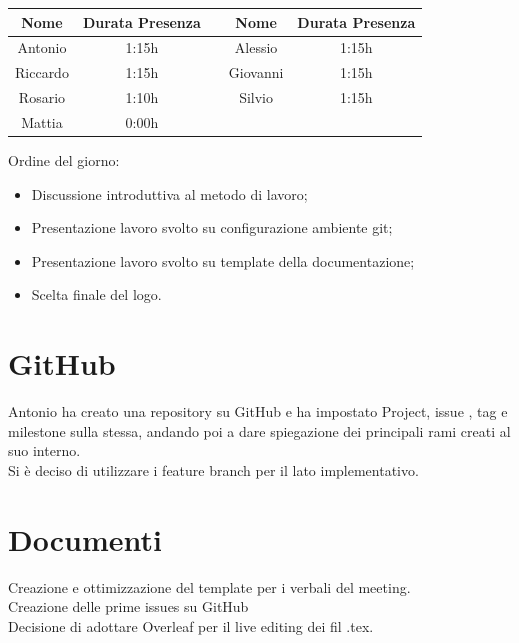 \documentclass[12pt,a4paper]{article}
\begin{document}
\begin{center}
    \begin{tabular}{ |c|c|c|c|c| }
        \hline
        Nome     & Durata Presenza &  & Nome     & Durata Presenza \\
        \hline
        Antonio  & 1:15h           &  & Alessio  & 1:15h           \\
        \hline
        Riccardo & 1:15h           &  & Giovanni & 1:15h           \\
        \hline
        Rosario  & 1:10h           &  & Silvio   & 1:15h           \\
        \hline
        Mattia   & 0:00h           &  &          &                 \\
        \hline

    \end{tabular}
\end{center}

\newpage
Ordine del giorno:

\begin{itemize}
    \item Discussione introduttiva al metodo di lavoro;    
    \item Presentazione lavoro svolto su configurazione ambiente git;
    \item Presentazione lavoro svolto su template della documentazione;
    \item Scelta finale del logo.

\end{itemize}

\section{GitHub}
Antonio ha creato una repository su GitHub e ha impostato Project, issue , tag e milestone sulla stessa, andando poi a dare spiegazione dei principali rami creati al suo interno. \\
Si è deciso di utilizzare i feature branch per il lato implementativo.\\

\section{Documenti}
Creazione e ottimizzazione del template per i verbali del meeting. \\
Creazione delle prime issues su GitHub\\
Decisione di adottare Overleaf per il live editing dei fil .tex.
\end{document}
